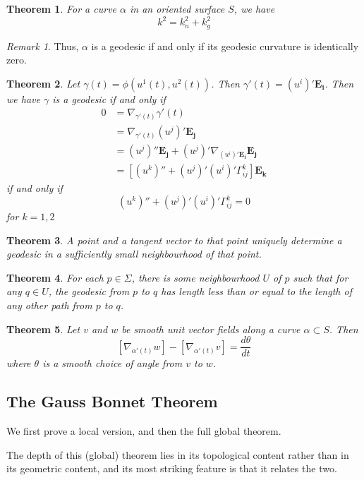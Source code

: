 \documentclass[10pt, oneside, reqno]{amsart}
\newcommand{\christ}[3]{\ensuremath{\Gamma^{#1}_{#2#3}}}
\theoremstyle{plain}%
\newtheorem{thm}{Theorem}[section]
\theoremstyle{definition}
\theoremstyle{remark}
\newtheorem*{rem}{Remark}
\begin{document}
\begin{thm}
	For a curve $\alpha$ in an oriented surface $S$, we have \[
		k^2 = k_n^2 + k_g^2
	\]
\end{thm}

\begin{rem}
	Thus, $\alpha$ is a geodesic if and only if its geodesic curvature is identically zero.
\end{rem}

\begin{thm}
	Let $\gamma(t) = \phi(u^1(t), u^2(t))$.  Then $\gamma'(t) = (u^i)'\mathbf{E_i}$.  Then we have $\gamma$ is a geodesic if and only if 
	\begin{align*}
		0 &= 	\nabla_{\gamma'(t)} \gamma'(t) \\
		&= \nabla_{\gamma'(t)} (u^j)' \mathbf{E_j} \\
		&= (u^j)'' \mathbf{E_j} + (u^j)' \nabla_{(u^i)' \mathbf{E_i}} \mathbf{E_j} \\
		&=  [(u^k)'' + (u^j)' (u^i)' \christ{k}{i}{j}] \mathbf{E_k}
	\end{align*}
	if and only if \[
		(u^k)'' + (u^j)' (u^i)' \christ{k}{i}{j} = 0
	\] for $k = 1,2$
\end{thm}

\begin{thm}
A point and a tangent vector to that point uniquely determine a geodesic in a sufficiently small neighbourhood of that point.
\end{thm}

\begin{thm}
	For each $p \in \Sigma$, there is some neighbourhood $U$ of $p$ such that for any $q \in U$, the geodesic from $p$ to $q$ has length less than or equal to the length of any other path from $p$ to $q$.
\end{thm}

\begin{thm}
	Let $v$ and $w$ be smooth \emph{unit} vector fields along a curve $\alpha \subset S$.  Then \[[	\nabla_{\alpha'(t)} w] - [	\nabla_{\alpha'(t)} v] = \frac{d \theta}{dt} \]
	where $\theta$ is a smooth choice of angle from $v$ to $w$.
\end{thm}

\subsection{The Gauss Bonnet Theorem}
We first prove a local version, and then the full global theorem.

The depth of this (global) theorem lies in its topological content rather than in its geometric content, and its most striking feature is that it relates the two.
\end{document}
